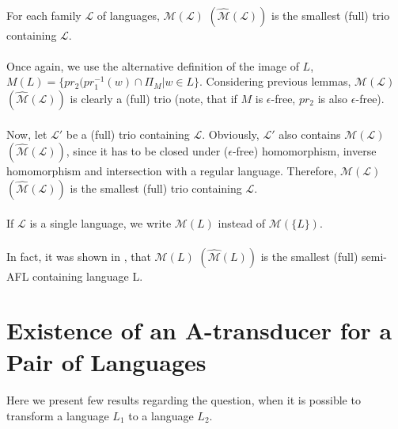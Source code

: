 \paragraph{}
\cveta For each family $\mathcal{L} $ of languages, $\mathcal{M(L)} $ $(\mathcal{\hat{M}(L)}) $ is the smallest (full) trio containing $\mathcal{L} $.

\paragraph{}
\dokaz Once again, we use the alternative definition of the image of $L$, $M(L) = \{ pr_{2}(pr_{1}^{-1}(w) \cap \Pi_{M} | w \in L \}$. Considering previous lemmas, $\mathcal{M(L)} $ $(\mathcal{\hat{M}(L)}) $ is clearly a (full) trio (note, that if $M$ is $\epsilon $-free, $pr_{2}$ is also $\epsilon $-free).

\paragraph{}
Now, let $\mathcal{L'} $ be a (full) trio containing $\mathcal{L} $. Obviously, $\mathcal{L'} $ also contains $\mathcal{M(L)} $ $(\mathcal{\hat{M}(L)}) $, since it has to be closed under ($\epsilon $-free) homomorphism, inverse homomorphism and intersection with a regular language. Therefore, $\mathcal{M(L)} $ $(\mathcal{\hat{M}(L)}) $ is the smallest (full) trio containing $\mathcal{L} $. \square

\paragraph{}
\oznacenie If $\mathcal{L}$ is a single language, we write $\mathcal{M}(L)$ instead of $\mathcal{M}(\{ L\} )$.

\paragraph{}
In fact, it was shown in \cite{gingrei:pAFL}, that $\mathcal{M}(L) $ $(\mathcal{\hat{M}}(L)) $ is the smallest (full) semi-AFL containing language L.

\section{Existence of an A-transducer for a Pair of Languages}
\paragraph{}
Here we present few results regarding the question, when it is possible to transform a language $L_{1}$ to a language $L_{2}$.

